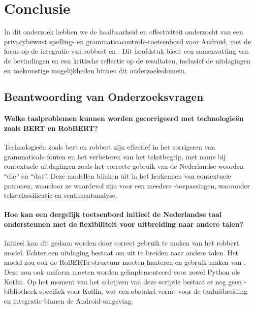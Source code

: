 
\chapter{Conclusie}%
\label{ch:conclusie}

In dit onderzoek hebben we de haalbaarheid en effectiviteit onderzocht van een privacybewust spelling- en grammaticacontrole-toetsenbord voor Android, met de focus op de integratie van \gls{robbert} en . Dit hoofdstuk biedt een samenvatting van de bevindingen en een kritische reflectie op de resultaten, inclusief de uitdagingen en toekomstige mogelijkheden binnen dit onderzoeksdomein.

\section{Beantwoording van Onderzoeksvragen}

\subsubsection{Welke taalproblemen kunnen worden gecorrigeerd met technologieën zoals BERT en RobBERT?}

Technologieën zoals \gls{bert} en \gls{robbert} zijn effectief in het corrigeren van grammaticale fouten en het verbeteren van het tekstbegrip, met name bij contextuele uitdagingen zoals het correcte gebruik van de Nederlandse woorden ``die'' en ``dat''. Deze modellen blinken uit in het herkennen van contextuele patronen, waardoor ze waardevol zijn voor een meedere -toepas\-singen, waaronder tekstclassificatie en sentimentanalyse.

\subsubsection{Hoe kan een dergelijk toetsenbord initieel de Nederlandse taal ondersteunen met de flexibiliteit voor uitbreiding naar andere talen?}

Initieel kan dit gedaan worden door correct gebruik te maken van het \gls{robbert} model. Echter een uitdaging bestaat om uit te breiden naar andere talen. Het model zou ook de RoBERTa-structuur moeten hanteren en gebruik maken van . Deze zou ook uniform moeten worden geïmplementeerd voor zowel Python als Kotlin. Op het moment van het schrijven van deze scriptie bestaat er nog geen -bibliotheek specifiek voor Kotlin, wat een obstakel vormt voor de taaluitbreiding en integratie binnen de Android-omgeving.

